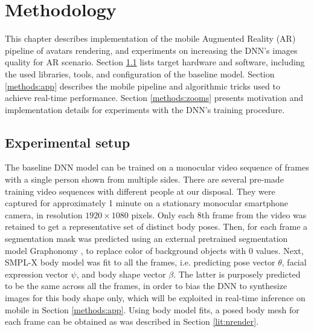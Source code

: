 \chapter{Methodology}\label{chapter:methods}

This chapter describes implementation of the mobile Augmented Reality (AR) pipeline of avatars rendering, and experiments on increasing the DNN's \cite{dnn:stylepeople21} images quality for AR scenario. Section \ref{methods:dev-setup} lists target hardware and software, including the used libraries, tools, and configuration of the baseline model. Section \ref{methods:app} describes the mobile pipeline and algorithmic tricks used to achieve real-time performance. Section \ref{methods:zooms} presents motivation and implementation details for experiments with the DNN's training procedure.

\section{Experimental setup}\label{methods:dev-setup}

The baseline DNN \cite{dnn:stylepeople21} model can be trained on a monocular video sequence of frames with a single person shown from multiple sides. There are several pre-made training video sequences with different people at our disposal. They were captured for approximately 1 minute on a stationary monocular smartphone camera, in resolution $1920 \times 1080$ pixels. Only each 8th frame from the video was retained to get a representative set of distinct body poses. Then, for each frame a segmentation mask was predicted using an external pretrained segmentation model Graphonomy \cite{dnn:graphonomy19}, to replace color of background objects with 0 values. Next, SMPL-X \cite{dnn:smplx19} body model was fit to all the frames, i.e. predicting pose vector $\theta$, facial expression vector $\psi$, and body shape vector $\beta$. The latter is purposely predicted to be the same across all the frames, in order to bias the DNN to synthesize images for this body shape only, which will be exploited in real-time inference on mobile in Section \ref{methods:app}. Using body model fits, a posed body mesh for each frame can be obtained as was described in Section \ref{lit:nrender}. 

